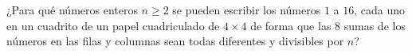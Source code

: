 ¿Para qué números enteros $n\ge 2$ se pueden escribir los números $1$ a $16$, cada uno en un cuadrito de un papel cuadriculado de $4\times 4$ de forma que las $8$ sumas de los números en las filas y columnas sean todas diferentes y divisibles por $n$?